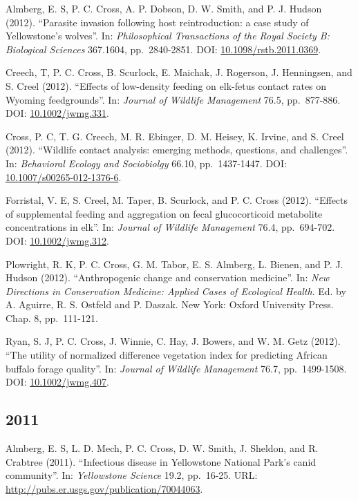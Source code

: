 \documentclass[12pt,]{article}
\begin{document}
Almberg, E. S, P. C. Cross, A. P. Dobson, D. W. Smith, and P. J. Hudson
(2012). ``Parasite invasion following host reintroduction: a case study
of Yellowstone's wolves''. In: \emph{Philosophical Transactions of the
Royal Society B: Biological Sciences} 367.1604, pp.~2840-2851. DOI:
\href{https://doi.org/10.1098\%2Frstb.2011.0369}{10.1098/rstb.2011.0369}.

Creech, T, P. C. Cross, B. Scurlock, E. Maichak, J. Rogerson, J.
Henningsen, and S. Creel (2012). ``Effects of low-density feeding on
elk-fetus contact rates on Wyoming feedgrounds''. In: \emph{Journal of
Wildlife Management} 76.5, pp.~877-886. DOI:
\href{https://doi.org/10.1002\%2Fjwmg.331}{10.1002/jwmg.331}.

Cross, P. C, T. G. Creech, M. R. Ebinger, D. M. Heisey, K. Irvine, and
S. Creel (2012). ``Wildlife contact analysis: emerging methods,
questions, and challenges''. In: \emph{Behavioral Ecology and
Sociobiolgy} 66.10, pp.~1437-1447. DOI:
\href{https://doi.org/10.1007\%2Fs00265-012-1376-6}{10.1007/s00265-012-1376-6}.

Forristal, V. E, S. Creel, M. Taper, B. Scurlock, and P. C. Cross
(2012). ``Effects of supplemental feeding and aggregation on fecal
glucocorticoid metabolite concentrations in elk''. In: \emph{Journal of
Wildlife Management} 76.4, pp.~694-702. DOI:
\href{https://doi.org/10.1002\%2Fjwmg.312}{10.1002/jwmg.312}.

Plowright, R. K, P. C. Cross, G. M. Tabor, E. S. Almberg, L. Bienen, and
P. J. Hudson (2012). ``Anthropogenic change and conservation medicine''.
In: \emph{New Directions in Conservation Medicine: Applied Cases of
Ecological Health}. Ed. by A. Aguirre, R. S. Ostfeld and P. Daszak. New
York: Oxford University Press. Chap. 8, pp.~111-121.

Ryan, S. J, P. C. Cross, J. Winnie, C. Hay, J. Bowers, and W. M. Getz
(2012). ``The utility of normalized difference vegetation index for
predicting African buffalo forage quality''. In: \emph{Journal of
Wildlife Management} 76.7, pp.~1499-1508. DOI:
\href{https://doi.org/10.1002\%2Fjwmg.407}{10.1002/jwmg.407}.

\hypertarget{section-8}{%
\subsection{2011}\label{section-8}}

Almberg, E. S, L. D. Mech, P. C. Cross, D. W. Smith, J. Sheldon, and R.
Crabtree (2011). ``Infectious disease in Yellowstone National Park's
canid community''. In: \emph{Yellowstone Science} 19.2, pp.~16-25. URL:
\url{http://pubs.er.usgs.gov/publication/70044063}.
\end{document}
